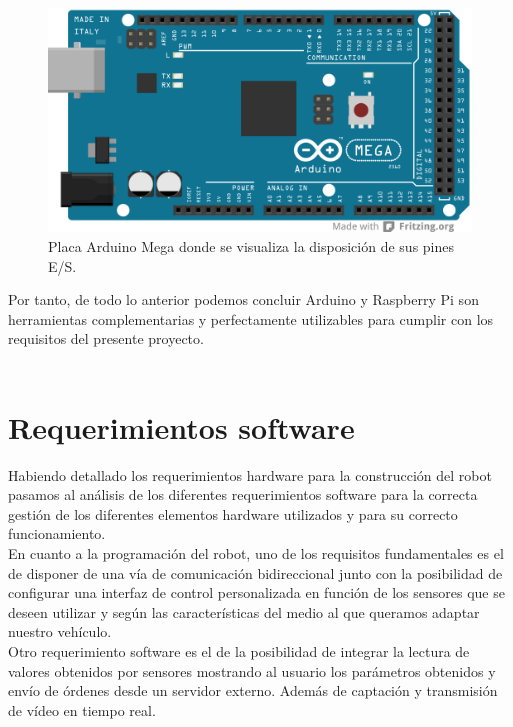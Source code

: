 \begin{figure}[H]
  \begin{center}
    \includegraphics[scale=0.4]{imagenes/arduino_mega_pinout.png}
  \end{center}
  \caption{Placa Arduino Mega donde se visualiza la disposición de sus pines E/S.}
  \label{gantt:tareas01}
\end{figure}

Por tanto, de todo lo anterior podemos concluir Arduino y Raspberry Pi son herramientas complementarias y perfectamente utilizables para cumplir con los requisitos del presente proyecto.\\\\


\section{Requerimientos software}
\label{sec:requerimientos-software}

Habiendo detallado los requerimientos hardware para la construcción del robot pasamos al análisis de los diferentes requerimientos software para la correcta
gestión de los diferentes elementos hardware utilizados y para su correcto funcionamiento.\\

En cuanto a la programación del robot, uno de los requisitos fundamentales es el de disponer de una vía de comunicación bidireccional junto con la posibilidad de
configurar una interfaz de control personalizada en función de los sensores que se deseen utilizar y según las características del medio al que queramos adaptar nuestro vehículo.\\

Otro requerimiento software es el de la posibilidad de integrar la lectura de valores obtenidos por sensores mostrando al usuario los parámetros obtenidos y envío de órdenes
desde un servidor externo. Además de captación y transmisión de vídeo en tiempo real.\\


